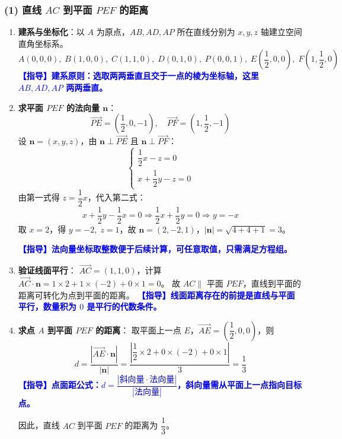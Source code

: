 \documentclass{article}
\newcommand{\comment}[1]{\textcolor{blue}{\small\textbf{【指导】#1}}}
\begin{document}
	
	\subsubsection*{(1) 直线 $AC$ 到平面 $PEF$ 的距离}
	
	\begin{enumerate}[label=\textbf{\arabic*.},leftmargin=*]
		\item \textbf{建系与坐标化}：以 $A$ 为原点，$AB,AD,AP$ 所在直线分别为 $x,y,z$ 轴建立空间直角坐标系。
		\[
		A(0,0,0),\; B(1,0,0),\; C(1,1,0),\; D(0,1,0),\; P(0,0,1),\;
		E\left(\frac{1}{2},0,0\right),\; F\left(1,\frac{1}{2},0\right)
		\]
		\comment{建系原则：选取两两垂直且交于一点的棱为坐标轴，这里 $AB,AD,AP$ 两两垂直。}
		
		\item \textbf{求平面 $PEF$ 的法向量 $\boldsymbol{n}$}：
		\[
		\overrightarrow{PE} = \left(\frac{1}{2},0,-1\right),\quad \overrightarrow{PF} = \left(1,\frac{1}{2},-1\right)
		\]
		设 $\boldsymbol{n}=(x,y,z)$，由 $\boldsymbol{n} \perp \overrightarrow{PE}$ 且 $\boldsymbol{n} \perp \overrightarrow{PF}$：
		\[
		\begin{cases}
			\dfrac{1}{2}x - z = 0 \\[6pt]
			x + \dfrac{1}{2}y - z = 0
		\end{cases}
		\]
		由第一式得 $z = \dfrac{1}{2}x$，代入第二式：
		\[
		x + \frac{1}{2}y - \frac{1}{2}x = 0 \Rightarrow \frac{1}{2}x + \frac{1}{2}y = 0 \Rightarrow y = -x
		\]
		取 $x=2$，得 $y=-2,\;z=1$，故 $\boldsymbol{n}=(2,-2,1)$，$|\boldsymbol{n}| = \sqrt{4+4+1}=3$。
		
		\comment{法向量坐标取整数便于后续计算，可任意取值，只需满足方程组。}
		
		\item \textbf{验证线面平行}：
		$\overrightarrow{AC} = (1,1,0)$，计算 $\overrightarrow{AC} \cdot \boldsymbol{n} = 1\times2 + 1\times(-2) + 0\times1 = 0$。
		故 $AC \parallel$ 平面 $PEF$，直线到平面的距离可转化为点到平面的距离。
		\comment{线面距离存在的前提是直线与平面平行，数量积为 $0$ 是平行的代数条件。}
		
		\item \textbf{求点 $A$ 到平面 $PEF$ 的距离}：
		取平面上一点 $E$，$\overrightarrow{AE} = \left(\dfrac{1}{2},0,0\right)$，则
		\[
		d = \frac{|\overrightarrow{AE} \cdot \boldsymbol{n}|}{|\boldsymbol{n}|}
		= \frac{\left|\dfrac{1}{2}\times2 + 0\times(-2) + 0\times1\right|}{3}
		= \frac{1}{3}
		\]
		\comment{点面距公式：$d = \dfrac{|\text{斜向量} \cdot \text{法向量}|}{|\text{法向量}|}$，斜向量需从平面上一点指向目标点。}
		
		因此，直线 $AC$ 到平面 $PEF$ 的距离为 $\dfrac{1}{3}$。
	\end{enumerate}
	
\end{document}
